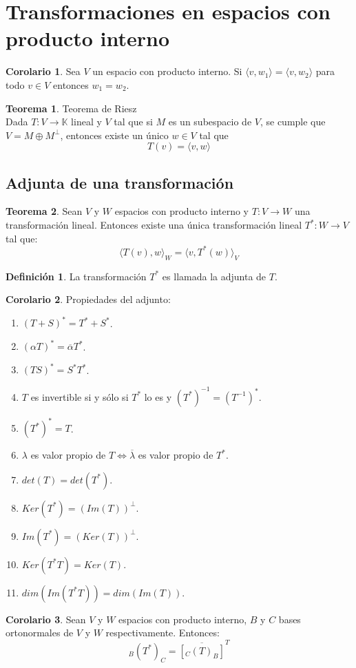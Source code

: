 \documentclass[10pt]{article}
\theoremstyle{definition}
\newtheorem{definition}{Definición}[section]
\newtheorem{theorem}{Teorema}[section]
\newtheorem{corollary}{Corolario}[theorem]
\begin{document}
\section{Transformaciones en espacios con producto interno}
\begin{corollary}
	Sea $V$ un espacio con producto interno. Si $\langle v,w_1\rangle=\langle v,w_2\rangle$ para todo $v\in V$ entonces $w_1=w_2$.
\end{corollary}
\begin{theorem}{Teorema de Riesz}
	\\Dada $T:V\to\mathbb{K}$ lineal y $V$ tal que si $M$ es un subespacio de $V$, se cumple que $V=M\oplus M^\bot$, entonces existe un único $w\in V$ tal que $$T(v)=\langle v,w\rangle$$
\end{theorem}
\subsection{Adjunta de una transformación}
\begin{theorem}
	Sean $V$ y $W$ espacios con producto interno y $T:V\to W$ una transformación lineal. Entonces existe una única transformación lineal $T^*:W\to V$ tal que: $$\langle T(v),w\rangle_W=\langle v,T^*(w)\rangle_V$$
\end{theorem}
\begin{definition}
	La transformación $T^*$ es llamada la adjunta de $T$.
\end{definition}
\begin{corollary}
	Propiedades del adjunto:
	\begin{enumerate}
		\item $(T+S)^*=T^*+S^*$.
		\item $(\alpha T)^*=\overline{\alpha}T^*$.
		\item $(TS)^*=S^*T^*$.
		\item $T$ es invertible si y sólo si $T^*$ lo es y $(T^*)^{-1}=(T^{-1})^*$.
		\item $(T^*)^*=T$.
		\item $\lambda$ es valor propio de $T\Leftrightarrow\overline{\lambda}$ es valor propio de $T^*$.
        \item $det(T)=det(T^*)$.
		\item $Ker(T^*)=(Im(T))^\bot$.
		\item $Im(T^*)=(Ker(T))^\bot$.
		\item $Ker(T^*T)=Ker(T)$.
		\item $dim(Im(T^*T))=dim(Im(T))$.
	\end{enumerate}
\end{corollary}
\begin{corollary}
	Sean $V$ y $W$ espacios con producto interno, $B$ y $C$ bases ortonormales de $V$ y $W$ respectivamente. Entonces:$$_B(T^*)_C=\overline{[_C(T)_B]}^T$$
\end{corollary}\newpage
\end{document}
